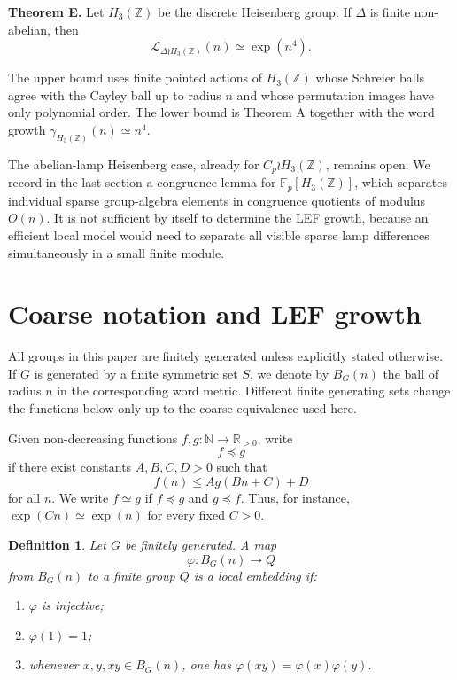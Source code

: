 \documentclass[11pt]{article}
\newcommand{\LEF}{\mathcal L}
\newcommand{\Z}{\mathbb Z}
\newcommand{\F}{\mathbb F}
\newcommand{\N}{\mathbb N}
\newcommand{\R}{\mathbb R}
\newtheorem{definition}[theorem]{Definition}
\begin{document}
\noindent\textbf{Theorem E.}
Let \(H_3(\Z)\) be the discrete Heisenberg group. If \(\Delta\) is finite non-abelian, then
\[
\LEF_{\Delta\wr H_3(\Z)}(n)\simeq \exp(n^4).
\]

The upper bound uses finite pointed actions of \(H_3(\Z)\) whose Schreier balls agree with the Cayley ball up to radius \(n\) and whose permutation images have only polynomial order. The lower bound is Theorem A together with the word growth \(\gamma_{H_3(\Z)}(n)\simeq n^4\).

The abelian-lamp Heisenberg case, already for \(C_p\wr H_3(\Z)\), remains open. We record in the last section a congruence lemma for \(\F_p[H_3(\Z)]\), which separates individual sparse group-algebra elements in congruence quotients of modulus \(O(n)\). It is not sufficient by itself to determine the LEF growth, because an efficient local model would need to separate all visible sparse lamp differences simultaneously in a small finite module.

\section{Coarse notation and LEF growth}

All groups in this paper are finitely generated unless explicitly stated otherwise. If \(G\) is generated by a finite symmetric set \(S\), we denote by \(B_G(n)\) the ball of radius \(n\) in the corresponding word metric. Different finite generating sets change the functions below only up to the coarse equivalence used here.

Given non-decreasing functions \(f,g:\N\to\R_{>0}\), write
\[
f\preceq g
\]
if there exist constants \(A,B,C,D>0\) such that
\[
f(n)\le A g(Bn+C)+D
\]
for all \(n\). We write \(f\simeq g\) if \(f\preceq g\) and \(g\preceq f\). Thus, for instance, \(\exp(Cn)\simeq \exp(n)\) for every fixed \(C>0\).

\begin{definition}
Let \(G\) be finitely generated. A map
\[
\varphi:B_G(n)\to Q
\]
from \(B_G(n)\) to a finite group \(Q\) is a local embedding if:
\begin{enumerate}
\item \(\varphi\) is injective;
\item \(\varphi(1)=1\);
\item whenever \(x,y,xy\in B_G(n)\), one has \(\varphi(xy)=\varphi(x)\varphi(y)\).
\end{enumerate}
\end{definition}
\end{document}
